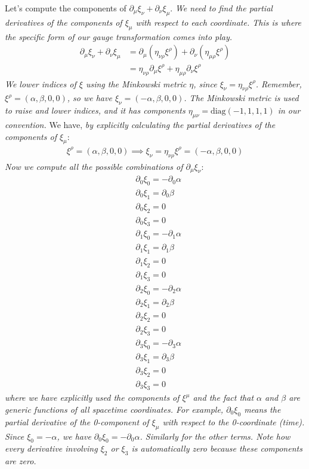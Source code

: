Let's compute the components of $\partial_{\mu} \xi_{\nu} + \partial_{\nu} \xi_{\mu}$. \emph{We need to find the partial derivatives of the components of $\xi_{\mu}$ with respect to each coordinate. This is where the specific form of our gauge transformation comes into play.}
\begin{align*}
\partial_{\mu} \xi_{\nu} + \partial_{\nu} \xi_{\mu} &= \partial_{\mu} (\eta_{\nu \rho}\xi^{\rho}) + \partial_{\nu} (\eta_{\mu \rho}\xi^{\rho}) \\
&= \eta_{\nu \rho}\partial_{\mu} \xi^{\rho} + \eta_{\mu \rho} \partial_{\nu} \xi^{\rho}
\end{align*}
\emph{We lower indices of $\xi$ using the Minkowski metric $\eta$, since $\xi_{\nu} = \eta_{\nu\rho}\xi^{\rho}$. Remember, $\xi^{\rho}=(\alpha, \beta, 0, 0)$, so we have $\xi_{\nu}=(-\alpha, \beta, 0, 0)$. The Minkowski metric is used to raise and lower indices, and it has components $\eta_{\mu\nu} = \text{diag}(-1, 1, 1, 1)$ in our convention.}
We have, \emph{by explicitly calculating the partial derivatives of the components of $\xi_{\mu}$}:
\begin{align*}
\xi^{\rho}=(\alpha, \beta, 0, 0) \implies \xi_{\nu}=\eta_{\nu \rho}\xi^{\rho}=(-\alpha, \beta, 0, 0)
\end{align*}
\emph{Now we compute all the possible combinations of $\partial_\mu \xi_\nu$}:
\begin{align*}
&\partial_0 \xi_0 = -\partial_0 \alpha \\
&\partial_0 \xi_1 = \partial_0 \beta \\
&\partial_0 \xi_2 = 0 \\
&\partial_0 \xi_3 = 0 \\
&\partial_1 \xi_0 = -\partial_1 \alpha \\
&\partial_1 \xi_1 = \partial_1 \beta \\
&\partial_1 \xi_2 = 0 \\
&\partial_1 \xi_3 = 0 \\
&\partial_2 \xi_0 = -\partial_2 \alpha \\
&\partial_2 \xi_1 = \partial_2 \beta \\
&\partial_2 \xi_2 = 0 \\
&\partial_2 \xi_3 = 0 \\
&\partial_3 \xi_0 = -\partial_3 \alpha \\
&\partial_3 \xi_1 = \partial_3 \beta \\
&\partial_3 \xi_2 = 0 \\
&\partial_3 \xi_3 = 0
\end{align*}
\emph{where we have explicitly used the components of $\xi^{\mu}$ and the fact that $\alpha$ and $\beta$ are generic functions of all spacetime coordinates. For example, $\partial_0 \xi_0$ means the partial derivative of the 0-component of $\xi_{\mu}$ with respect to the 0-coordinate (time). Since $\xi_0 = -\alpha$, we have $\partial_0 \xi_0 = -\partial_0 \alpha$. Similarly for the other terms. Note how every derivative involving $\xi_2$ or $\xi_3$ is automatically zero because these components are zero.}

